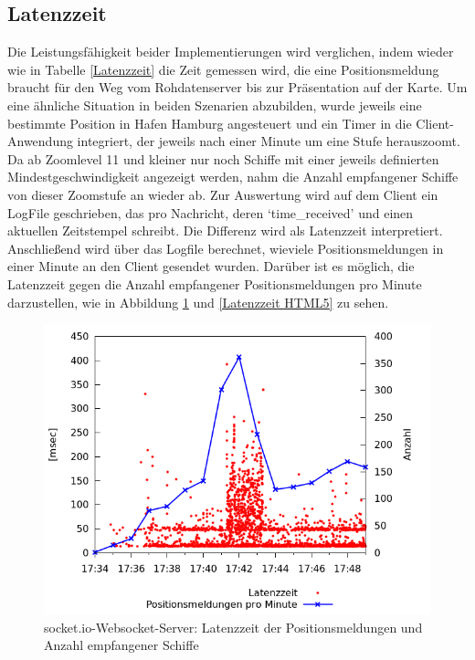 \subsection{Latenzzeit}
Die Leistungsfähigkeit beider Implementierungen wird verglichen, indem wieder wie in Tabelle \ref{Latenzzeit} die Zeit gemessen wird, die eine Positionsmeldung braucht für den Weg vom Rohdatenserver bis zur Präsentation auf der Karte. Um eine ähnliche Situation in beiden Szenarien abzubilden, wurde jeweils eine bestimmte Position in Hafen Hamburg angesteuert und ein Timer in die Client-Anwendung integriert, der jeweils nach einer Minute um eine Stufe herauszoomt. Da ab Zoomlevel 11 und kleiner nur noch Schiffe mit einer jeweils definierten Mindestgeschwindigkeit angezeigt werden, nahm die Anzahl empfangener Schiffe von dieser Zoomstufe an wieder ab. Zur Auswertung wird auf dem Client ein LogFile geschrieben, das pro Nachricht, deren ‘time\_received’ und einen aktuellen Zeitstempel schreibt.  Die Differenz wird als Latenzzeit interpretiert. Anschließend wird über das Logfile berechnet, wieviele Positionsmeldungen in einer Minute an den Client gesendet wurden. Darüber ist es möglich, die Latenzzeit gegen die Anzahl empfangener Positionsmeldungen pro Minute darzustellen, wie in Abbildung \ref{Latenzzeit socket.io} und \ref{Latenzzeit HTML5} zu sehen.
\begin {figure}[H]
\begin{center}
  \includegraphics[width=4.5in]{images/latency_timeReceived_socket_io.png}
\end{center}
\caption{socket.io-Websocket-Server: Latenzzeit der Positionsmeldungen und Anzahl empfangener Schiffe}
\label {Latenzzeit socket.io}
\end {figure}

